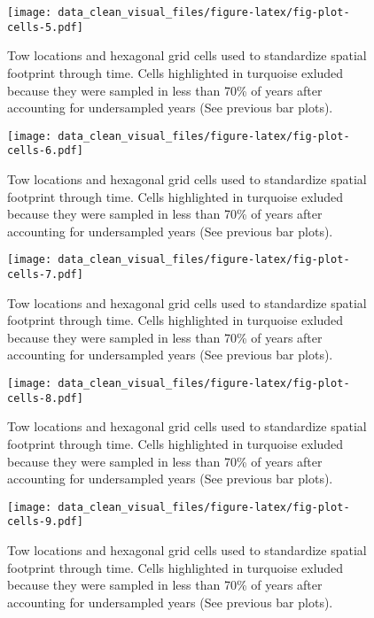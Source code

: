 \documentclass[
]{article}
\begin{document}
\begin{figure}
\centering
\texttt{[image: data\_clean\_visual\_files/figure-latex/fig-plot-cells-5.pdf]}
\caption{\label{fig:fig-plot-cells-5}Tow locations and hexagonal grid cells used to standardize spatial footprint through time. Cells highlighted in turquoise exluded because they were sampled in less than 70\% of years after accounting for undersampled years (See previous bar plots).}
\end{figure}

\begin{figure}
\centering
\texttt{[image: data\_clean\_visual\_files/figure-latex/fig-plot-cells-6.pdf]}
\caption{\label{fig:fig-plot-cells-6}Tow locations and hexagonal grid cells used to standardize spatial footprint through time. Cells highlighted in turquoise exluded because they were sampled in less than 70\% of years after accounting for undersampled years (See previous bar plots).}
\end{figure}

\begin{figure}
\centering
\texttt{[image: data\_clean\_visual\_files/figure-latex/fig-plot-cells-7.pdf]}
\caption{\label{fig:fig-plot-cells-7}Tow locations and hexagonal grid cells used to standardize spatial footprint through time. Cells highlighted in turquoise exluded because they were sampled in less than 70\% of years after accounting for undersampled years (See previous bar plots).}
\end{figure}

\begin{figure}
\centering
\texttt{[image: data\_clean\_visual\_files/figure-latex/fig-plot-cells-8.pdf]}
\caption{\label{fig:fig-plot-cells-8}Tow locations and hexagonal grid cells used to standardize spatial footprint through time. Cells highlighted in turquoise exluded because they were sampled in less than 70\% of years after accounting for undersampled years (See previous bar plots).}
\end{figure}

\begin{figure}
\centering
\texttt{[image: data\_clean\_visual\_files/figure-latex/fig-plot-cells-9.pdf]}
\caption{\label{fig:fig-plot-cells-9}Tow locations and hexagonal grid cells used to standardize spatial footprint through time. Cells highlighted in turquoise exluded because they were sampled in less than 70\% of years after accounting for undersampled years (See previous bar plots).}
\end{figure}
\end{document}
